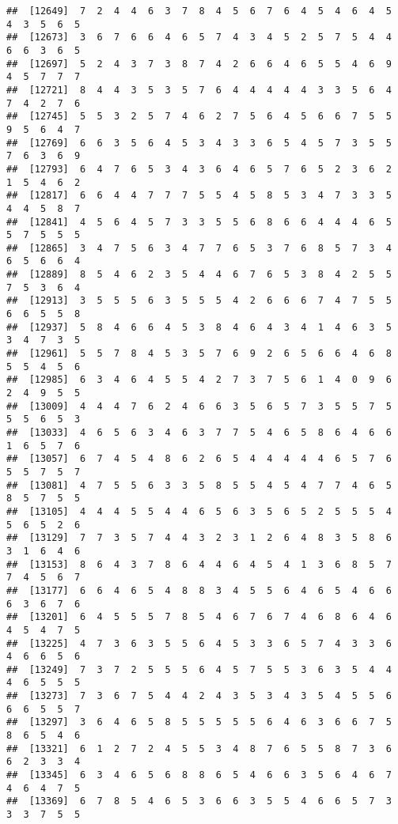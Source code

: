 \documentclass[
]{book}
\begin{document}
\begin{verbatim}
##  [12649]  7  2  4  4  6  3  7  8  4  5  6  7  6  4  5  4  6  4  5  4  3  5  6  5
##  [12673]  3  6  7  6  6  4  6  5  7  4  3  4  5  2  5  7  5  4  4  6  6  3  6  5
##  [12697]  5  2  4  3  7  3  8  7  4  2  6  6  4  6  5  5  4  6  9  4  5  7  7  7
##  [12721]  8  4  4  3  5  3  5  7  6  4  4  4  4  4  3  3  5  6  4  7  4  2  7  6
##  [12745]  5  5  3  2  5  7  4  6  2  7  5  6  4  5  6  6  7  5  5  9  5  6  4  7
##  [12769]  6  6  3  5  6  4  5  3  4  3  3  6  5  4  5  7  3  5  5  7  6  3  6  9
##  [12793]  6  4  7  6  5  3  4  3  6  4  6  5  7  6  5  2  3  6  2  1  5  4  6  2
##  [12817]  6  6  4  4  7  7  7  5  5  4  5  8  5  3  4  7  3  3  5  4  4  5  8  7
##  [12841]  4  5  6  4  5  7  3  3  5  5  6  8  6  6  4  4  4  6  5  5  7  5  5  5
##  [12865]  3  4  7  5  6  3  4  7  7  6  5  3  7  6  8  5  7  3  4  6  5  6  6  4
##  [12889]  8  5  4  6  2  3  5  4  4  6  7  6  5  3  8  4  2  5  5  7  5  3  6  4
##  [12913]  3  5  5  5  6  3  5  5  5  4  2  6  6  6  7  4  7  5  5  6  6  5  5  8
##  [12937]  5  8  4  6  6  4  5  3  8  4  6  4  3  4  1  4  6  3  5  3  4  7  3  5
##  [12961]  5  5  7  8  4  5  3  5  7  6  9  2  6  5  6  6  4  6  8  5  5  4  5  6
##  [12985]  6  3  4  6  4  5  5  4  2  7  3  7  5  6  1  4  0  9  6  2  4  9  5  5
##  [13009]  4  4  4  7  6  2  4  6  6  3  5  6  5  7  3  5  5  7  5  5  5  6  5  3
##  [13033]  4  6  5  6  3  4  6  3  7  7  5  4  6  5  8  6  4  6  6  1  6  5  7  6
##  [13057]  6  7  4  5  4  8  6  2  6  5  4  4  4  4  4  6  5  7  6  5  5  7  5  7
##  [13081]  4  7  5  5  6  3  3  5  8  5  5  4  5  4  7  7  4  6  5  8  5  7  5  5
##  [13105]  4  4  4  5  5  4  4  6  5  6  3  5  6  5  2  5  5  5  4  5  6  5  2  6
##  [13129]  7  7  3  5  7  4  4  3  2  3  1  2  6  4  8  3  5  8  6  3  1  6  4  6
##  [13153]  8  6  4  3  7  8  6  4  4  6  4  5  4  1  3  6  8  5  7  7  4  5  6  7
##  [13177]  6  6  4  6  5  4  8  8  3  4  5  5  6  4  6  5  4  6  6  6  3  6  7  6
##  [13201]  6  4  5  5  5  7  8  5  4  6  7  6  7  4  6  8  6  4  6  4  5  4  7  5
##  [13225]  4  7  3  6  3  5  5  6  4  5  3  3  6  5  7  4  3  3  6  4  6  6  5  6
##  [13249]  7  3  7  2  5  5  5  6  4  5  7  5  5  3  6  3  5  4  4  4  6  5  5  5
##  [13273]  7  3  6  7  5  4  4  2  4  3  5  3  4  3  5  4  5  5  6  6  6  5  5  7
##  [13297]  3  6  4  6  5  8  5  5  5  5  5  6  4  6  3  6  6  7  5  8  6  5  4  6
##  [13321]  6  1  2  7  2  4  5  5  3  4  8  7  6  5  5  8  7  3  6  6  2  3  3  4
##  [13345]  6  3  4  6  5  6  8  8  6  5  4  6  6  3  5  6  4  6  7  4  6  4  7  5
##  [13369]  6  7  8  5  4  6  5  3  6  6  3  5  5  4  6  6  5  7  3  3  3  7  5  5

\end{verbatim}
\end{document}
